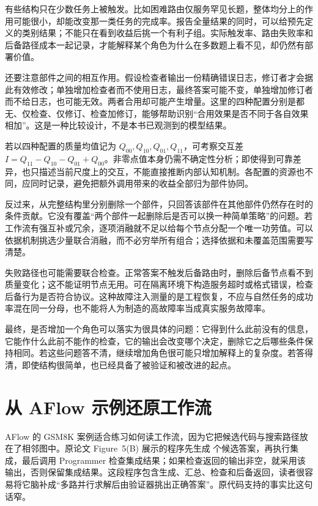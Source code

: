 有些结构只在少数任务上被触发。比如困难路由仅服务罕见长题，整体均分上的作用可能很小，却能改变那一类任务的完成率。报告全量结果的同时，可以给预先定义的类别结果；不能只在看到收益后挑一个有利子组。实际触发率、路由失败率和后备路径成本一起记录，才能解释某个角色为什么在多数题上看不见，却仍然有部署价值。

还要注意部件之间的相互作用。假设检查者输出一份精确错误日志，修订者才会据此有效修改；单独增加检查者而不使用日志，最终答案可能不变，单独增加修订者而不给日志，也可能无效。两者合用却可能产生增量。这里的四种配置分别是都无、仅检查、仅修订、检查加修订，能够帮助识别“合用效果是否不同于各自效果相加”。这是一种比较设计，不是本书已观测到的模型结果。

若以四种配置的质量均值记为 $Q_{00},Q_{10},Q_{01},Q_{11}$，可考察交互差 $I=Q_{11}-Q_{10}-Q_{01}+Q_{00}$。非零点值本身仍需不确定性分析；即使得到可靠差异，也只描述当前尺度上的交互，不能直接推断内部认知机制。各配置的资源也不同，应同时记录，避免把额外调用带来的收益全部归为部件协同。

反过来，从完整结构里分别删除一个部件，只回答该部件在其他部件仍然存在时的条件贡献。它没有覆盖“两个部件一起删除后是否可以换一种简单策略”的问题。若工作流有强互补或冗余，逐项消融就不足以给每个节点分配一个唯一功劳值。可以依据机制挑选少量联合消融，而不必穷举所有组合；选择依据和未覆盖范围需要写清楚。

失败路径也可能需要联合检查。正常答案不触发后备路由时，删除后备节点看不到质量变化；这不能证明节点无用。可在隔离环境下构造服务超时或格式错误，检查后备行为是否符合协议。这种故障注入测量的是工程恢复，不应与自然任务的成功率混在同一分母，也不能将人为制造的高故障率当成真实服务故障率。

最终，是否增加一个角色可以落实为很具体的问题：它得到什么此前没有的信息，它能作什么此前不能作的检查，它的输出会改变哪个决定，删除它之后哪些条件保持相同。若这些问题答不清，继续增加角色很可能只增加解释上的复杂度。若答得清，即使结构很简单，也已经具备了被验证和被改进的起点。

\section{从 AFlow 示例还原工作流}
\label{sec:ch09-codecase}

AFlow 的 GSM8K 案例适合练习如何读工作流，因为它把候选代码与搜索路径放在了相邻图中。原论文 Figure~5(B) 展示的程序先生成  个候选答案，再执行集成，最后调用 Programmer 检查集成结果；如果检查返回的输出非空，就采用该输出，否则保留集成结果\cite{aflow-2410}。这段程序包含生成、汇总、检查和后备返回，读者很容易将它脑补成“多路并行求解后由验证器挑出正确答案”。原代码支持的事实比这句话窄。


